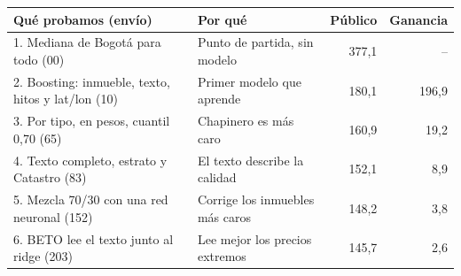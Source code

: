 \begin{tabular}{llrr}
\toprule
Qué probamos (envío) & Por qué & Público & Ganancia \\
\midrule
1. Mediana de Bogotá para todo (00) & Punto de partida, sin modelo & 377,1 & -- \\
2. Boosting: inmueble, texto, hitos y lat/lon (10) & Primer modelo que aprende & 180,1 & 196,9 \\
3. Por tipo, en pesos, cuantil 0,70 (65) & Chapinero es más caro & 160,9 & 19,2 \\
4. Texto completo, estrato y Catastro (83) & El texto describe la calidad & 152,1 & 8,9 \\
5. Mezcla 70/30 con una red neuronal (152) & Corrige los inmuebles más caros & 148,2 & 3,8 \\
6. BETO lee el texto junto al ridge (203) & Lee mejor los precios extremos & 145,7 & 2,6 \\
\bottomrule
\end{tabular}
